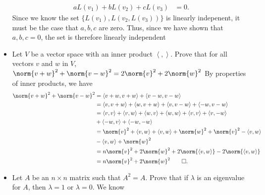 \documentclass{report}
\begin{document}
\begin{itemize}
\begin{align*}
                aL(v_{1}) + bL(v_{2}) + cL(v_{3}) &= 0
            .\end{align*}
            Since we know the set $\{L(v_{1}), L(v_{2}, L(v_{3}))\} $ is linearly indepenent, it must be the case that $a,b,c$ are zero. Thus, since we have shown that $a,b,c = 0$, the set is therefore linearly independent
        \item Let $V$ be a vector space with an inner product $\left\langle , \right\rangle $. Prove that for all vectors $v$ and $w$ in $V$, $\norm{v+w}^{2} + \norm{v-w}^{2} = 2\norm{v}^{2} + 2\norm{w}^{2}$
            \bigbreak \noindent 
            By properties of inner products, we have
            \begin{align*}
                \norm{v+w}^{2} + \norm{v-w}^{2} &= \left\langle v+w, v+w \right\rangle + \left\langle v-w, v-w \right\rangle \\
                &= \left\langle v,v+w \right\rangle + \left\langle w, v+w \right\rangle + \left\langle v, v-w \right\rangle + \left\langle -w, v-w \right\rangle \\
                                                &= \left\langle v,v \right\rangle + \left\langle v,w \right\rangle + \left\langle w,v \right\rangle + \left\langle w,w \right\rangle + \left\langle v,v \right\rangle  + \left\langle v,-w \right\rangle\\
                                                &+\left\langle -w,v \right\rangle + \left\langle -w,-w \right\rangle \\
                                                &=\norm{v}^{2} + \left\langle v,w \right\rangle + \left\langle v,w \right\rangle + \norm{w}^{2} +\norm{v}^{2} - \left\langle v,w \right\rangle  \\
                                                &-\left\langle v,w \right\rangle + \norm{w}^{2} \\
                                                &=n\norm{v}^{2} + 2\norm{w}^{2} + 2\norm{\left\langle v,w \right\rangle} - 2\norm{\left\langle v,w  \right\rangle} \\
                                                &=n\norm{v}^{2} + 2\norm{w}^{2} \qed
            .\end{align*}
        \item Let $A$ be an $n\times n$ matrix such that $A^{2} = A$. Prove that if $\lambda$ is an eigenvalue for $A$, then $\lambda = 1$ or $\lambda = 0$.
            \bigbreak \noindent 
            We know
            \begin{align*}

\end{align*}
\end{itemize}
\end{document}
